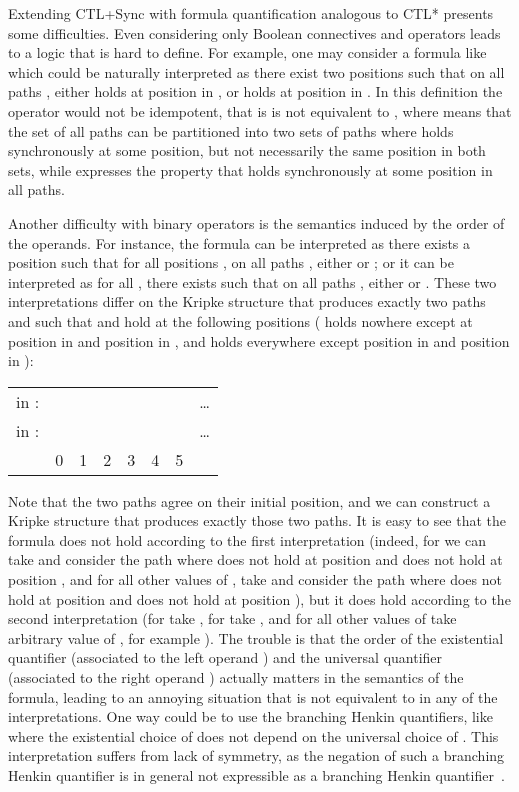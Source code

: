 \documentclass{article}
\begin{document}
Extending CTL+Sync with formula quantification analogous to CTL* presents some difficulties. Even considering only Boolean connectives and  operators
leads to a logic that is hard to define. For example, one may consider
a formula like  which could be 
naturally interpreted as there exist two positions  such that 
on all paths , either  holds at position  in , or  holds at
position  in . In this definition the  operator would not be idempotent, 
that is  is not equivalent to ,
where  means that the set of all paths can be partitioned into
two sets of paths where  holds synchronously at some position, 
but not necessarily the same position in both sets, while  expresses the
property that  holds synchronously at some position in all paths. 

Another difficulty with binary operators is the semantics induced by the order of the operands. 
For instance, the formula 
can be interpreted as  there exists a position  such that for all positions ,
on all paths , either  or ;
or it can be interpreted as  for all , there exists  
such that on all paths , either  or .
These two interpretations differ on the Kripke structure that produces exactly
two paths  and  such that  and  hold at the following 
positions ( holds nowhere except at position  in  and position 
in , and  holds everywhere except position  in  and position 
in ): 
\begin{center}
\begin{tabular}{lccccccc}
in : &  &  &  &   &   &  & \dots \\
in : &  &  &  &   &   &  & \dots \\
             & 0 & 1 & 2 & 3 & 4 & 5 &  \\
\end{tabular}
\end{center} 
Note that the two paths agree on their initial position, and we can
construct a Kripke structure that produces exactly those two paths.
It is easy to see that the formula  does not hold 
according to the first interpretation (indeed, for  we can take  and consider the path 
where  does not hold at position  and  does not hold at position ,
and for all other values of , take  and consider the path 
where  does not hold at position  and  does not hold at position ), 
but it does hold according to the second interpretation
(for  take , for  take , and for all other values
of  take arbitrary value of , for example ).
The trouble is that the order of the existential
quantifier (associated to the left operand ) and the universal quantifier
(associated to the right operand ) actually matters in the semantics
of the formula, leading to an annoying situation that 
is not equivalent to  in any of the interpretations.
One way could be to use the branching Henkin quantifiers, like 
where the existential choice of  does not depend on the universal choice of .
This interpretation suffers from lack of symmetry, as the negation of such 
a branching Henkin quantifier is in general not expressible as a 
branching Henkin quantifier~\cite{BG86}.
\end{document}
